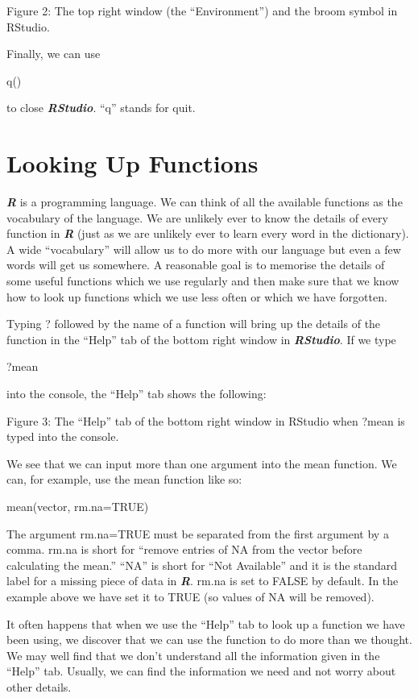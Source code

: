 \documentclass[
]{book}
\begin{document}
Figure 2: The top right window (the ``Environment'') and the broom symbol in RStudio.

Finally, we can use

q()

to close \textbf{\emph{RStudio}}. ``q'' stands for quit.

\section{Looking Up Functions}\label{looking-up-functions}

\textbf{\emph{R}} is a programming language. We can think of all the available functions as the vocabulary of the language. We are unlikely ever to know the details of every function in \textbf{\emph{R}} (just as we are unlikely ever to learn every word in the dictionary). A wide ``vocabulary'' will allow us to do more with our language but even a few words will get us somewhere. A reasonable goal is to memorise the details of some useful functions which we use regularly and then make sure that we know how to look up functions which we use less often or which we have forgotten.

Typing ? followed by the name of a function will bring up the details of the function in the ``Help'' tab of the bottom right window in \textbf{\emph{RStudio}}. If we type

?mean

into the console, the ``Help'' tab shows the following:

Figure 3: The ``Help'' tab of the bottom right window in RStudio when ?mean is typed into the console.

We see that we can input more than one argument into the mean function. We can, for example, use the mean function like so:

mean(vector, rm.na=TRUE)

The argument rm.na=TRUE must be separated from the first argument by a comma. rm.na is short for ``remove entries of NA from the vector before calculating the mean.'' ``NA'' is short for ``Not Available'' and it is the standard label for a missing piece of data in \textbf{\emph{R}}. rm.na is set to FALSE by default. In the example above we have set it to TRUE (so values of NA will be removed).

It often happens that when we use the ``Help'' tab to look up a function we have been using, we discover that we can use the function to do more than we thought. We may well find that we don't understand all the information given in the ``Help'' tab. Usually, we can find the information we need and not worry about other details.
\end{document}
